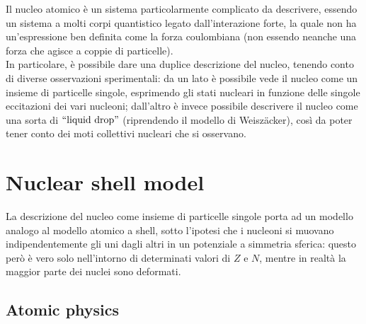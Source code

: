 
Il nucleo atomico è un sistema particolarmente complicato da descrivere, essendo un sistema a molti corpi quantistico legato dall'interazione forte, la quale non ha un'espressione ben definita come la forza coulombiana (non essendo neanche una forza che agisce a coppie di particelle).\\
In particolare, è possibile dare una duplice descrizione del nucleo, tenendo conto di diverse osservazioni sperimentali: da un lato è possibile vede il nucleo come un insieme di particelle singole, esprimendo gli stati nucleari in funzione delle singole eccitazioni dei vari nucleoni; dall'altro è invece possibile descrivere il nucleo come una sorta di $ ``\text{liquid drop}" $ (riprendendo il modello di Weiszäcker), così da poter tener conto dei moti collettivi nucleari che si osservano.

\section{Nuclear shell model}

La descrizione del nucleo come insieme di particelle singole porta ad un modello analogo al modello atomico a shell, sotto l'ipotesi che i nucleoni si muovano indipendentemente gli uni dagli altri in un potenziale a simmetria sferica: questo però è vero solo nell'intorno di determinati valori di $ Z $ e $ N $, mentre in realtà la maggior parte dei nuclei sono deformati.

\subsection{Atomic physics}

